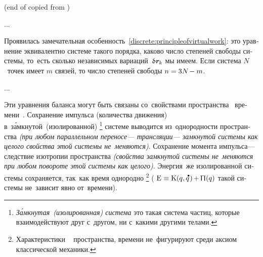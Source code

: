 \begin{otherlanguage}{russian}
(end of copied from )

...


Проявилась замечательная особенность~\eqref{discrete:principleofvirtualwork}\::
это уравнение эквивалентно системе такого порядка,
каково число степеней свободы системы,
то~есть сколько независимых вариаций~${\variation{\hspace{.1ex}\locationvector_{\hspace{-0.1ex}k}}}$ мы имеем.
Если система $N$~точек имеет $m$ связей,
то число степеней свободы
${n = 3N \hspace{-0.25ex} - m}$.

...




Эти уравнения баланса
могут быть связаны
со~свойствами
пространства
~времени~\cite{landau.lifshitz-shortcourse}.
Сохранение импульса
(количества движения)
в~з\'{а}мкнутой~(изолированной)%
\footnote{\emph{З\'{а}мкнутая~(изолированная) система}
это такая система частиц,
которые
взаимодействуют
друг с~другом,
ни с~какими другими телами.}\hspace{-0.25ex}
системе выводится из~однородности пространства \emph{(при любом параллельном переносе\:--- трансляции\:--- замкнутой системы как целого свойства этой системы не~меняются)}.
Сохранение момента импульса\:--- следствие изотропии пространства \emph{(свойства замкнутой системы не~меняются при любом повороте этой системы как целого)}.
Энергия~же
изолированной системы
сохраняется,
так~как
время однородно%
%
\footnote{%
Характеристики
~
пространства,
времени
не~фигурируют среди аксиом
классической механики.
}\hspace{-0.25ex} %
(
${\mathrm{E} \hspace{.1ex} \equiv \kineticenergyinmechanics \hspace{.1ex} (q, \mathdotabove{q} \hspace{.2ex}) \hspace{-0.2ex} + \hspace{-0.1ex} \potentialenergyinmechanics (q)}$
такой системы
не~зависит явно от~времени).


\end{otherlanguage}
